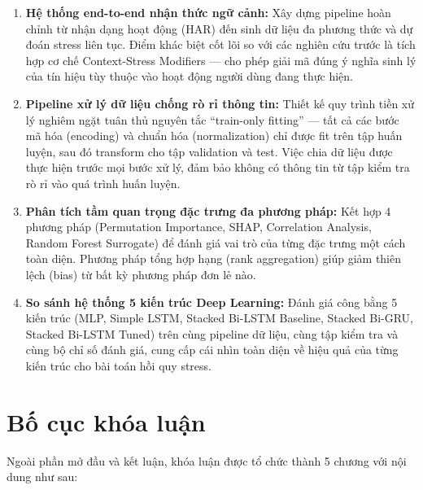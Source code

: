 \begin{enumerate}
    \item \textbf{Hệ thống end-to-end nhận thức ngữ cảnh:} Xây dựng pipeline hoàn chỉnh từ nhận dạng hoạt động (HAR) đến sinh dữ liệu đa phương thức và dự đoán stress liên tục. Điểm khác biệt cốt lõi so với các nghiên cứu trước là tích hợp cơ chế Context-Stress Modifiers — cho phép giải mã đúng ý nghĩa sinh lý của tín hiệu tùy thuộc vào hoạt động người dùng đang thực hiện.
    
    \item \textbf{Pipeline xử lý dữ liệu chống rò rỉ thông tin:} Thiết kế quy trình tiền xử lý nghiêm ngặt tuân thủ nguyên tắc ``train-only fitting'' — tất cả các bước mã hóa (encoding) và chuẩn hóa (normalization) chỉ được fit trên tập huấn luyện, sau đó transform cho tập validation và test. Việc chia dữ liệu được thực hiện trước mọi bước xử lý, đảm bảo không có thông tin từ tập kiểm tra rò rỉ vào quá trình huấn luyện.
    
    \item \textbf{Phân tích tầm quan trọng đặc trưng đa phương pháp:} Kết hợp 4 phương pháp (Permutation Importance, SHAP, Correlation Analysis, Random Forest Surrogate) để đánh giá vai trò của từng đặc trưng một cách toàn diện. Phương pháp tổng hợp hạng (rank aggregation) giúp giảm thiên lệch (bias) từ bất kỳ phương pháp đơn lẻ nào.
    
    \item \textbf{So sánh hệ thống 5 kiến trúc Deep Learning:} Đánh giá công bằng 5 kiến trúc (MLP, Simple LSTM, Stacked Bi-LSTM Baseline, Stacked Bi-GRU, Stacked Bi-LSTM Tuned) trên cùng pipeline dữ liệu, cùng tập kiểm tra và cùng bộ chỉ số đánh giá, cung cấp cái nhìn toàn diện về hiệu quả của từng kiến trúc cho bài toán hồi quy stress.
\end{enumerate}


\section{Bố cục khóa luận}
\label{sec:bo_cuc}

Ngoài phần mở đầu và kết luận, khóa luận được tổ chức thành 5 chương với nội dung như sau:

